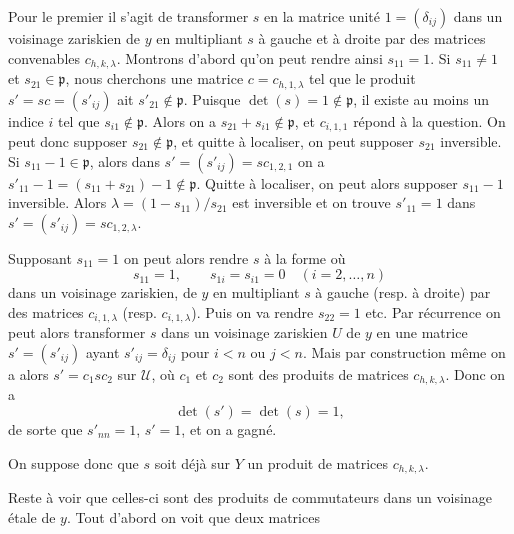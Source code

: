 Pour le premier il s'agit de transformer \(s\) en la matrice unité \(1=(\delta_{ij})\) dans un voisinage zariskien de \(y\) en multipliant \(s\) à gauche et à droite par des matrices convenables \(c_{h,k,\lambda}\). Montrons d'abord qu'on peut rendre ainsi \(s_{11}=1\). Si \(s_{11}\ne1\) et \(s_{21}\in\mathfrak p\), nous cherchons une matrice \(c=c_{h,1,\lambda}\) tel que le produit \(s'=sc=(s'_{ij})\) ait \(s'_{21}\notin\mathfrak p\). Puisque \(\det(s)=1\notin\mathfrak p\), il existe au moins un indice \(i\) tel que \(s_{i1}\notin\mathfrak p\). Alors on a \(s_{21}+s_{i1}\notin\mathfrak p\), et \(c_{i,1,1}\) répond à la question. On peut donc supposer \(s_{21}\notin\mathfrak p\), et quitte à localiser, on peut supposer \(s_{21}\) inversible. Si \(s_{11}-1\in\mathfrak p\), alors dans \(s'=(s'_{ij})=sc_{1,2,1}\) on a
\(s'_{11}-1=(s_{11}+s_{21})-1\notin\mathfrak p\). Quitte à localiser, on peut alors supposer \(s_{11}-1\) inversible. Alors \(\lambda=(1-s_{11})/s_{21}\) est inversible et on trouve \(s'_{11}=1\) dans \(s'=(s'_{ij})=sc_{1,2,\lambda}\).

Supposant \(s_{11}=1\) on peut alors rendre \(s\) à la forme où
\[
 s_{11}=1,\qquad s_{1i}=s_{i1}=0\quad(i=2,\ldots,n)
\]
dans un voisinage zariskien, de \(y\) en multipliant \(s\) à gauche (resp. à droite) par des matrices \(c_{i,1,\lambda}\) (resp. \(c_{i,1,\lambda}\)). Puis on va rendre \(s_{22}=1\) etc. Par récurrence on peut alors transformer \(s\) dans un voisinage zariskien \(U\) de \(y\) en une matrice \(s'=(s'_{ij})\) ayant \(s'_{ij}=\delta_{ij}\) pour \(i<n\) ou \(j<n\). Mais par construction même on a alors \(s'=c_1sc_2\) sur \(\mathcal U\), où \(c_1\) et \(c_2\) sont des produits de matrices \(c_{h,k,\lambda}\). Donc on a
\[
 \det(s')=\det(s)=1,
\]
de sorte que \(s'_{nn}=1\), \(s'=1\), et on a gagné.

On suppose donc que \(s\) soit déjà sur \(Y\) un produit de matrices \(c_{h,k,\lambda}\).

Reste à voir que celles-ci sont des produits de commutateurs dans un voisinage étale de \(y\). Tout d'abord on voit que deux matrices
